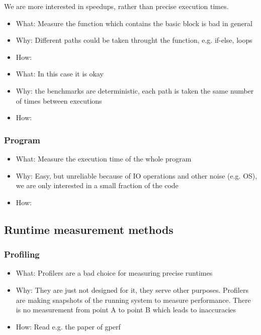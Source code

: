 We are more interested in speedups, rather than precise execution times.


\begin{itemize}
    \item What: Measure the function which contains the basic block is bad in general
    \item Why: Different paths could be taken throught the function, e.g. if-else, loops
    \item How: 
\end{itemize}
\begin{itemize}
    \item What: In this case it is okay
    \item Why: the benchmarks are deterministic, each path is taken the same number of times between executions
    \item How: 
\end{itemize}
\subsubsection{Program}
\begin{itemize}
    \item What: Measure the execution time of the whole program
    \item Why: Easy, but unreliable because of IO operations and other noise (e.g. OS), we are only interested in a small fraction of the code
    \item How: 
\end{itemize}

\subsection{Runtime measurement methods}
\subsubsection{Profiling}
\begin{itemize}
    \item What: Profilers are a bad choice for measuring precise runtimes
    \item Why: They are just not designed for it, they serve other purposes.
        Profilers are making snapshots of the running system to measure performance. 
        There is no measurement from point A to point B which leads to inaccuracies
    \item How: Read e.g. the paper of gperf \cite{graham1982gprof}
\end{itemize}
